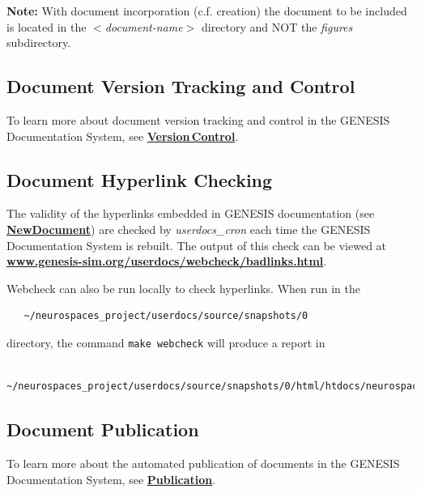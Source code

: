 \documentclass[12pt]{article}
\begin{document}
{\bf Note:} With document incorporation (c.f. creation) the document to be included is located in the {\it $<$document-name$>$} directory and NOT the {\it figures} subdirectory.

\subsection*{Document Version Tracking and Control}

To learn more about document version tracking and control in the GENESIS Documentation System, see \href{../version-control/version-control.tex}{\bf Version\,Control}.

\subsection*{Document Hyperlink Checking}

The validity of the hyperlinks embedded in GENESIS documentation (see \href{../NewDocument/NewDocument.tex}{\bf NewDocument}) are checked by {\it userdocs\_cron} each time the GENESIS Documentation System is rebuilt. The output of this check can be viewed at \href{http://www.genesis-sim.org/userdocs/webcheck/badlinks.html}{\bf www.genesis-sim.org/userdocs/webcheck/badlinks.html}.

Webcheck can also be run locally to check hyperlinks. When run in the
\begin{verbatim}
   ~/neurospaces_project/userdocs/source/snapshots/0
\end{verbatim}
directory, the command {\tt make\,webcheck} will produce a report in
\begin{verbatim}
   ~/neurospaces_project/userdocs/source/snapshots/0/html/htdocs/neurospaces_project/userdocs/webcheck/
\end{verbatim}

\subsection*{Document Publication}

To learn more about the automated publication of documents in the GENESIS Documentation System, see \href{../publication/publication.tex}{\bf Publication}.
\end{document}
